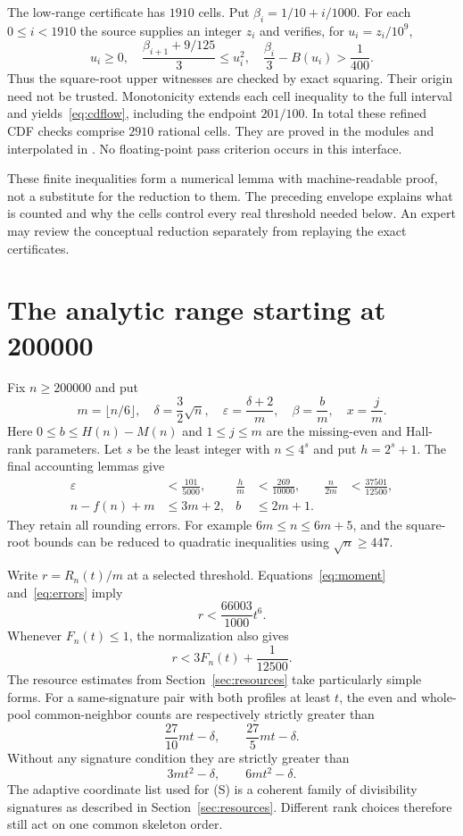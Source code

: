 The low-range certificate has $1910$ cells. Put $\beta_i=1/10+i/1000$. For each $0\le i<1910$ the source supplies an integer $z_i$ and verifies, for $u_i=z_i/10^9$,
\[
 u_i\ge0,\quad
 \frac{\beta_{i+1}+9/125}{3}\le u_i^2,\quad
 \frac{\beta_i}3-B(u_i)>\frac1{400}.
\]
Thus the square-root upper witnesses are checked by exact squaring. Their origin need not be trusted. Monotonicity extends each cell inequality to the full interval and yields~\eqref{eq:cdflow}, including the endpoint $201/100$. In total these refined CDF checks comprise $2910$ rational cells. They are proved in the  modules and interpolated in . No floating-point pass criterion occurs in this interface.

These finite inequalities form a numerical lemma with machine-readable proof, not a substitute for the reduction to them. The preceding envelope explains what is counted and why the cells control every real threshold needed below. An expert may review the conceptual reduction separately from replaying the exact certificates.

\section{The analytic range starting at 200000}\label{sec:analytic}
Fix $n\ge200000$ and put
\[
 m=\lfloor n/6\rfloor,\quad \delta=\frac32\sqrt n,\quad
 \varepsilon=\frac{\delta+2}{m},\quad
 \beta=\frac bm,\quad x=\frac jm.
\]
Here $0\le b\le H(n)-M(n)$ and $1\le j\le m$ are the missing-even and Hall-rank parameters. Let $s$ be the least integer with $n\le4^s$ and put $h=2^s+1$. The final accounting lemmas give
\begin{align}
 \varepsilon&<\frac{101}{5000},&
 \frac hm&<\frac{269}{10000},&
 \frac{n}{2m}&<\frac{37501}{12500},\label{eq:errors}\\
 n-f(n)+m&\le3m+2,&
 b&\le2m+1.\label{eq:rounding}
\end{align}
They retain all rounding errors. For example $6m\le n\le6m+5$, and the square-root bounds can be reduced to quadratic inequalities using $\sqrt n\ge447$.

Write $r=R_n(t)/m$ at a selected threshold. Equations~\eqref{eq:moment} and~\eqref{eq:errors} imply
\[
 r<\frac{66003}{1000}t^6.\tag{M}
\]
Whenever $F_n(t)\le1$, the normalization also gives
\[
 r<3F_n(t)+\frac1{12500}.\tag{N}
\]
The resource estimates from Section~\ref{sec:resources} take particularly simple forms. For a same-signature pair with both profiles at least $t$, the even and whole-pool common-neighbor counts are respectively strictly greater than
\[
 \frac{27}{10}mt-\delta,\qquad
 \frac{27}{5}mt-\delta.\tag{S}
\]
Without any signature condition they are strictly greater than
\[
 3mt^2-\delta,\qquad6mt^2-\delta.\tag{U}
\]
The adaptive coordinate list used for (S) is a coherent family of divisibility signatures as described in Section~\ref{sec:resources}. Different rank choices therefore still act on one common skeleton order.

